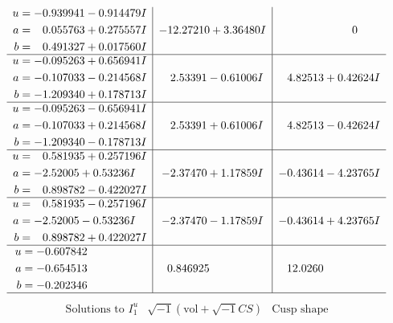 \documentclass[1p]{elsarticle_modified}
\theoremstyle{definition}
\newcommand{\I}{\sqrt{-1}}
\begin{document}
$$\begin{array}{c|c|c}
\begin{aligned}
u &= -0.939941 - 0.914479 I \\
a &= \phantom{-}0.055763 + 0.275557 I \\
b &= \phantom{-}0.491327 + 0.017560 I\end{aligned}
 & -12.27210 + 3.36480 I & \phantom{-0.000000 } 0 \\ \hline\begin{aligned}
u &= -0.095263 + 0.656941 I \\
a &= -0.107033 - 0.214568 I \\
b &= -1.209340 + 0.178713 I\end{aligned}
 & \phantom{-}2.53391 - 0.61006 I & \phantom{-}4.82513 + 0.42624 I \\ \hline\begin{aligned}
u &= -0.095263 - 0.656941 I \\
a &= -0.107033 + 0.214568 I \\
b &= -1.209340 - 0.178713 I\end{aligned}
 & \phantom{-}2.53391 + 0.61006 I & \phantom{-}4.82513 - 0.42624 I \\ \hline\begin{aligned}
u &= \phantom{-}0.581935 + 0.257196 I \\
a &= -2.52005 + 0.53236 I \\
b &= \phantom{-}0.898782 - 0.422027 I\end{aligned}
 & -2.37470 + 1.17859 I & -0.43614 - 4.23765 I \\ \hline\begin{aligned}
u &= \phantom{-}0.581935 - 0.257196 I \\
a &= -2.52005 - 0.53236 I \\
b &= \phantom{-}0.898782 + 0.422027 I\end{aligned}
 & -2.37470 - 1.17859 I & -0.43614 + 4.23765 I \\ \hline\begin{aligned}
u &= -0.607842\phantom{ +0.000000I} \\
a &= -0.654513\phantom{ +0.000000I} \\
b &= -0.202346\phantom{ +0.000000I}\end{aligned}
 & \phantom{-}0.846925\phantom{ +0.000000I} & \phantom{-}12.0260\phantom{ +0.000000I}\\
 \hline 
 \end{array}$$\newpage$$\begin{array}{c|c|c}  
\text{Solutions to }I^u_{1}& \I (\text{vol} + \sqrt{-1}CS) & \text{Cusp shape}\\

\end{array}$$
\end{document}

